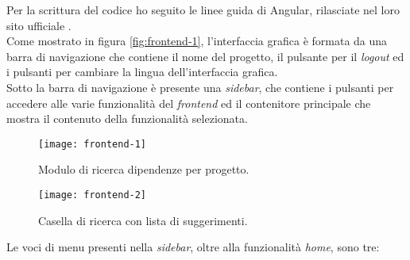 Per la scrittura del codice ho seguito le linee guida di Angular, rilasciate nel loro sito ufficiale \cite{site:angular-style-guide}.\\

Come mostrato in figura \ref*{fig:frontend-1}, l'interfaccia grafica è formata da una barra di navigazione che contiene il nome del progetto,
il pulsante per il \textit{logout} ed i pulsanti per cambiare la lingua dell'interfaccia grafica.\\
Sotto la barra di navigazione è presente una \textit{sidebar}, che contiene i pulsanti per accedere alle varie funzionalità del \textit{frontend} 
ed il contenitore principale che mostra il contenuto della funzionalità selezionata.\\
\begin{figure}[!h]
  \centering
  \begin{minipage}{0.45\textwidth}
      \centering
      \texttt{[image: frontend-1]}
      \caption{Modulo di ricerca dipendenze per progetto.}
      \label{fig:frontend-1}
  \end{minipage}\hfill
  \begin{minipage}{0.45\textwidth}
      \centering
      \texttt{[image: frontend-2]}
      \caption{Casella di ricerca con lista di suggerimenti.}
      \label{fig:frontend-2}
  \end{minipage}
\end{figure}
Le voci di menu presenti nella \textit{sidebar}, oltre alla funzionalità \textit{home}, sono tre:
